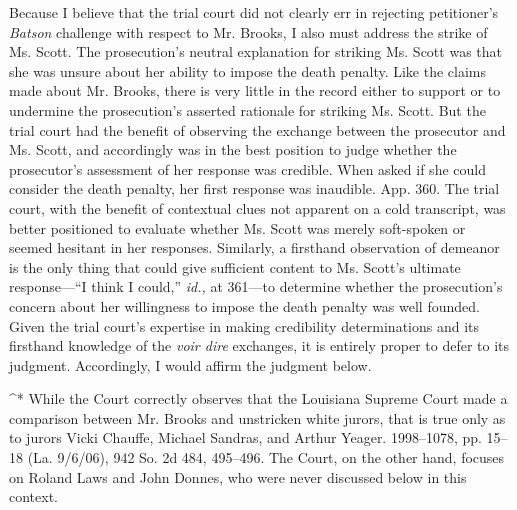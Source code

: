   Because I believe that the trial court did not clearly err in
rejecting petitioner's \emph{Batson} challenge with respect to Mr.
Brooks, I also must address the strike of Ms. Scott. The prosecution's
neutral explanation for striking Ms. Scott was \newpage  that she was
unsure about her ability to impose the death penalty. Like the claims
made about Mr. Brooks, there is very little in the record either to
support or to undermine the prosecution's asserted rationale for
striking Ms. Scott. But the trial court had the benefit of observing
the exchange between the prosecutor and Ms. Scott, and accordingly was
in the best position to judge whether the prosecutor's assessment of
her response was credible. When asked if she could consider the death
penalty, her first response was inaudible. App. 360. The trial
court, with the benefit of contextual clues not apparent on a cold
transcript, was better positioned to evaluate whether Ms. Scott was
merely soft-spoken or seemed hesitant in her responses. Similarly, a
firsthand observation of demeanor is the only thing that could give
sufficient content to Ms. Scott's ultimate response---``I think I
could,'' \emph{id.,} at 361---to determine whether the prosecution's
concern about her willingness to impose the death penalty was well
founded. Given the trial court's expertise in making credibility
determinations and its firsthand knowledge of the \emph{voir dire}
exchanges, it is entirely proper to defer to its judgment. Accordingly,
I would affirm the judgment below.

^* While the Court correctly observes that the Louisiana Supreme Court  
made a comparison between Mr. Brooks and unstricken white jurors,       
that is true only as to jurors Vicki Chauffe, Michael Sandras, and      
Arthur Yeager. 1998--1078, pp. 15--18 (La. 9/6/06), 942 So. 2d 484,   
495--496. The Court, on the other hand, focuses on Roland Laws and     
John Donnes, who were never discussed below in this context.            
